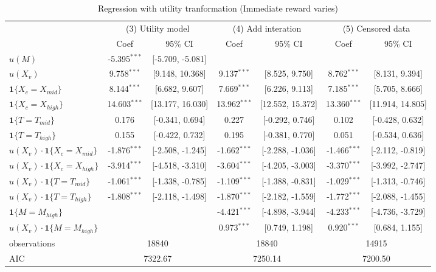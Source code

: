 \documentclass[12pt]{article}
\begin{document}
\begin{table}
    \centering
    \caption{Regression with utility tranformation (Immediate reward varies)}
    \vspace*{12pt}
        
\begin{tabular}{lcccccc}
  \hline
   & \multicolumn{2}{c}{(3) Utility model} & \multicolumn{2}{c}{(4) Add interation} & \multicolumn{2}{c}{(5) Censored data} \\ & Coef & 95\% CI & Coef & 95\% CI & Coef & 95\% CI \\ \hline
$u(M)$ & -5.395$^{***}$ & [-5.709, -5.081] &  &  &  &  \\ 
  $u(X_v)$ & 9.758$^{***}$ & [9.148, 10.368] & 9.137$^{***}$ & [8.525, 9.750] & 8.762$^{***}$ & [8.131, 9.394] \\ 
  $\textbf{1}\{X_c = X_{mid}\}$ & 8.144$^{***}$ & [6.682, 9.607] & 7.669$^{***}$ & [6.226, 9.113] & 7.185$^{***}$ & [5.705, 8.666] \\ 
  $\textbf{1}\{X_c = X_{high}\}$ & 14.603$^{***}$ & [13.177, 16.030] & 13.962$^{***}$ & [12.552, 15.372] & 13.360$^{***}$ & [11.914, 14.805] \\ 
  $\textbf{1}\{T = T_{mid}\}$ & 0.176 & [-0.341, 0.694] & 0.227 & [-0.292, 0.746] & 0.102 & [-0.428, 0.632] \\ 
  $\textbf{1}\{T = T_{high}\}$ & 0.155 & [-0.422, 0.732] & 0.195 & [-0.381, 0.770] & 0.051 & [-0.534, 0.636] \\ 
  $u(X_v)\cdot\textbf{1}\{X_c = X_{mid}\}$ & -1.876$^{***}$ & [-2.508, -1.245] & -1.662$^{***}$ & [-2.288, -1.036] & -1.466$^{***}$ & [-2.112, -0.819] \\ 
  $u(X_v)\cdot\textbf{1}\{X_c = X_{high}\}$ & -3.914$^{***}$ & [-4.518, -3.310] & -3.604$^{***}$ & [-4.205, -3.003] & -3.370$^{***}$ & [-3.992, -2.747] \\ 
  $u(X_v)\cdot\textbf{1}\{T = T_{mid}\}$ & -1.061$^{***}$ & [-1.338, -0.785] & -1.109$^{***}$ & [-1.388, -0.831] & -1.029$^{***}$ & [-1.313, -0.746] \\ 
  $u(X_v)\cdot\textbf{1}\{T = T_{high}\}$ & -1.808$^{***}$ & [-2.118, -1.498] & -1.870$^{***}$ & [-2.182, -1.559] & -1.772$^{***}$ & [-2.088, -1.455] \\ 
  $\textbf{1}\{M = M_{high}\}$ &  &  & -4.421$^{***}$ & [-4.898, -3.944] & -4.233$^{***}$ & [-4.736, -3.729] \\ 
  $u(X_v)\cdot\textbf{1}\{M = M_{high}\}$ &  &  & 0.973$^{***}$ & [0.749, 1.198] & 0.920$^{***}$ & [0.684, 1.155] \\ 
   \hline observations & \multicolumn{2}{c}{18840} & \multicolumn{2}{c}{18840} & \multicolumn{2}{c}{14915} \\ AIC & \multicolumn{2}{c}{7322.67} & \multicolumn{2}{c}{7250.14} & \multicolumn{2}{c}{7200.50} \\ \hline
\end{tabular}


\end{table}
\end{document}
